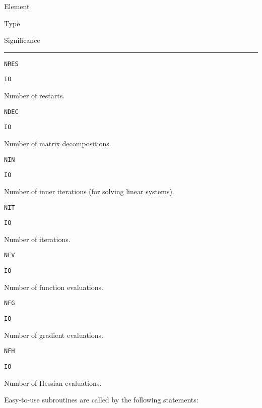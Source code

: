 \documentclass{esub2acm}
\begin{document}
\noindent\parbox{20mm}{Element}\parbox{10mm}{$\!$Type}\parbox[t]{125mm}
  {Significance}\par\noindent\rule[1mm]{155mm}{.4pt}
  \par
\noindent\parbox{20mm}{\tt NRES}\parbox{10mm}{\tt IO}\parbox[t]{125mm}{
  Number of restarts.}
  \par\vspace{2mm}
\noindent\parbox{20mm}{\tt NDEC}\parbox{10mm}{\tt IO}\parbox[t]{125mm}{
  Number of matrix decompositions.}
  \par\vspace{2mm}
\noindent\parbox{20mm}{\tt NIN}\parbox{10mm}{\tt IO}\parbox[t]{125mm}{
  Number of inner iterations (for solving linear systems).}
  \par\vspace{2mm}
\noindent\parbox{20mm}{\tt NIT}\parbox{10mm}{\tt IO}\parbox[t]{125mm}{
  Number of iterations.}
  \par\vspace{2mm}
\noindent\parbox{20mm}{\tt NFV}\parbox{10mm}{\tt IO}\parbox[t]{125mm}{
  Number of function evaluations.}
  \par\vspace{2mm}
\noindent\parbox{20mm}{\tt NFG}\parbox{10mm}{\tt IO}\parbox[t]{125mm}{
  Number of gradient evaluations.}
  \par\vspace{2mm}
\noindent\parbox{20mm}{\tt NFH}\parbox{10mm}{\tt IO}\parbox[t]{125mm}{
  Number of Hessian evaluations.}

\vspace{5mm}

\rm

\noindent Easy-to-use subroutines are called by the following statements:
\end{document}
